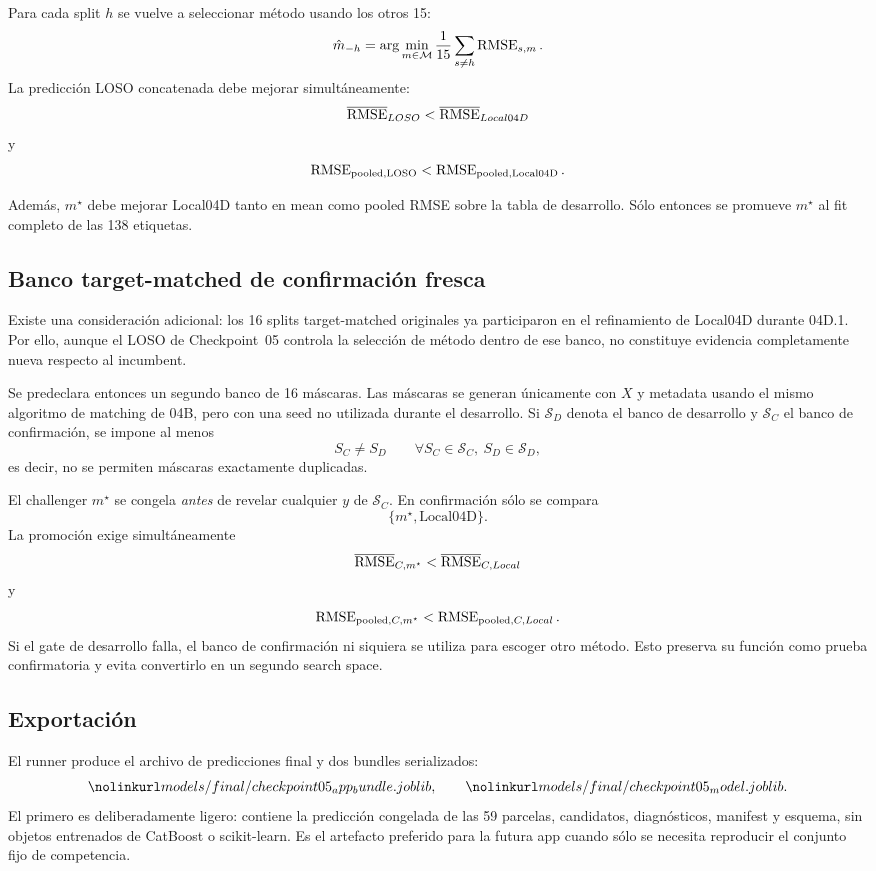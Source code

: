 Para cada split $h$ se vuelve a seleccionar método usando los otros 15:
\[
\hat m_{-h}
=
\arg\min_{m\in\mathcal M}
\frac{1}{15}\sum_{s\neq h}\operatorname{RMSE}_{s,m}.
\]
La predicción LOSO concatenada debe mejorar simultáneamente:
\[
\overline{\operatorname{RMSE}}_{LOSO}
<
\overline{\operatorname{RMSE}}_{Local04D}
\]
y
\[
\operatorname{RMSE}_{\mathrm{pooled,LOSO}}
<
\operatorname{RMSE}_{\mathrm{pooled,Local04D}}.
\]

Además, $m^\star$ debe mejorar Local04D tanto en mean como pooled RMSE sobre la tabla de
desarrollo. Sólo entonces se promueve $m^\star$ al fit completo de las 138 etiquetas.

\subsection{Banco target-matched de confirmación fresca}

Existe una consideración adicional: los 16 splits target-matched originales ya participaron
en el refinamiento de Local04D durante 04D.1. Por ello, aunque el LOSO de Checkpoint~05
controla la selección de método dentro de ese banco, no constituye evidencia completamente
nueva respecto al incumbent.

Se predeclara entonces un segundo banco de 16 máscaras. Las máscaras se generan únicamente
con $X$ y metadata usando el mismo algoritmo de matching de 04B, pero con una seed no utilizada
durante el desarrollo. Si $\mathcal S_D$ denota el banco de desarrollo y $\mathcal S_C$ el
banco de confirmación, se impone al menos
\[
S_C\neq S_D
\qquad
\forall S_C\in\mathcal S_C,\ S_D\in\mathcal S_D,
\]
es decir, no se permiten máscaras exactamente duplicadas.

El challenger $m^\star$ se congela \emph{antes} de revelar cualquier $y$ de
$\mathcal S_C$. En confirmación sólo se compara
\[
\{m^\star,\mathrm{Local04D}\}.
\]
La promoción exige simultáneamente
\[
\overline{\operatorname{RMSE}}_{C,m^\star}
<
\overline{\operatorname{RMSE}}_{C,Local}
\]
y
\[
\operatorname{RMSE}_{\mathrm{pooled},C,m^\star}
<
\operatorname{RMSE}_{\mathrm{pooled},C,Local}.
\]
Si el gate de desarrollo falla, el banco de confirmación ni siquiera se utiliza para escoger
otro método. Esto preserva su función como prueba confirmatoria y evita convertirlo en un
segundo search space.

\subsection{Exportación}

El runner produce el archivo de predicciones final y dos bundles serializados:
\[
\artifact{models/final/checkpoint05_app_bundle.joblib},
\qquad
\artifact{models/final/checkpoint05_model.joblib}.
\]
El primero es deliberadamente ligero: contiene la predicción congelada de las 59 parcelas,
candidatos, diagnósticos, manifest y esquema, sin objetos entrenados de CatBoost o
scikit-learn. Es el artefacto preferido para la futura app cuando sólo se necesita reproducir
el conjunto fijo de competencia.


